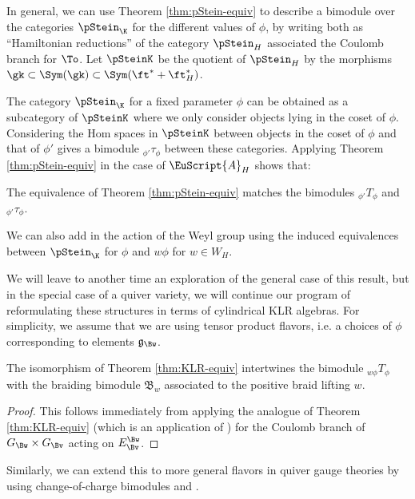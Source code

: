 In general, we can use Theorem \ref{thm:pStein-equiv} to describe a bimodule over the categories $\pStein_\K$ for the different values of $\phi$, by writing both as ``Hamiltonian reductions'' of the category $\pStein_H$ associated the Coulomb branch for $\To$.  Let $\pSteinK$ be the quotient of $\pStein_H$ by the morphisms $\gk\subset \Sym(\gk)\subset  \Sym(\ft^*+\ft_H^*)$.  

The category $\pStein_\K$ for a fixed parameter $\phi$ can be obtained as a subcategory of $\pSteinK$ where we only consider objects 
lying in the coset of $\phi$. Considering the Hom spaces in $\pSteinK$ between objects in the coset of $\phi$ and that of $\phi'$ gives a bimodule ${}_{\phi'}\tau_{\phi}$ between these categories.  
Applying Theorem \ref{thm:pStein-equiv} in the case of $\EuScript{A}_{H}$ shows that:
\begin{theorem}
  The equivalence of Theorem \ref{thm:pStein-equiv} matches the bimodules ${}_{\phi'}T_{\phi}$ and ${}_{\phi'}\tau_{\phi}$.
\end{theorem}
We can also add in the action of the Weyl group using the induced equivalences between $\pStein_\K$ for $\phi$ and $w\phi$ for $w\in W_H$.

We will leave to another time an exploration of the general case of this result, but in the special case of a quiver variety, we will continue our program of reformulating these structures in terms of cylindrical KLR algebras.  For simplicity, we assume that we are using tensor product flavors, i.e. a choices of $\phi$ corresponding to elements $\mathfrak{g}_{\Bw}$.  

\begin{proposition}\label{prop:braidings-match}
  The isomorphism of Theorem \ref{thm:KLR-equiv} intertwines the
  bimodule ${}_{w\phi}T_{\phi}$ with the braiding bimodule $\mathfrak{B}_w$ associated to
  the positive braid lifting $w$.  
\end{proposition}
\begin{proof}
This follows immediately from applying the analogue of Theorem
\ref{thm:KLR-equiv} (which is an application of
\cite[Thm. 4.2]{WebSD}) for the Coulomb branch of $G_\Bw\times
G_{\Bv}$ acting on $E_{\Bv}^{\Bw}$.   
\end{proof}
Similarly, we can extend this to more general flavors in quiver gauge theories by using change-of-charge bimodules \cite[\S 2.5]{WebwKLR} and \cite[\S 5.3]{WebRou}.

